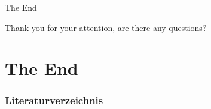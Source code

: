 \documentclass[compress,aspectratio=1610]{beamer}
\begin{document}
\begin{frame}{The End}
  \begin{center}
    Thank you for your attention, are there any questions?
  \end{center}
\end{frame}

\section*{The End}
\begin{frame}[allowframebreaks]
  \frametitle{Literaturverzeichnis}
  
  
\end{frame}
\end{document}

